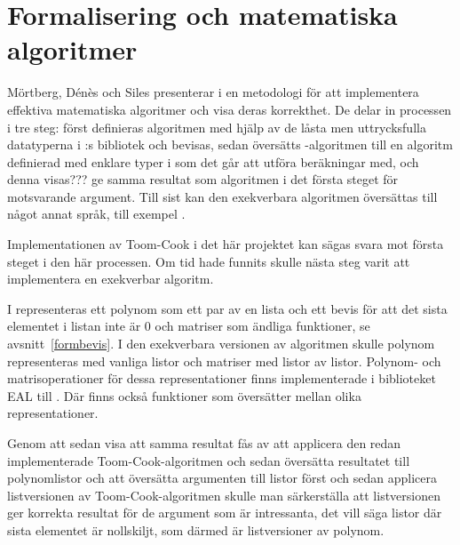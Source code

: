 \section{Formalisering och matematiska algoritmer}
\label{sec:exekverbert}
Mörtberg, Dénès och Siles presenterar i \cite{denes2012refinement} en
metodologi för att implementera effektiva matematiska algoritmer och visa deras
korrekthet. De delar in processen i tre steg: först definieras algoritmen med
hjälp av de låsta men uttrycksfulla datatyperna i \ssr{}:s bibliotek och
bevisas, sedan översätts \ssr{}-algoritmen till en algoritm definierad med
enklare typer i \ssr{} som det går att utföra beräkningar med, och denna
visas??? ge samma resultat som algoritmen i det första steget för motsvarande
argument. Till sist kan den exekverbara algoritmen översättas till något annat
språk, till exempel \haskell{}.

Implementationen av Toom-Cook i det här projektet kan sägas svara mot första
steget i den här processen. Om tid hade funnits skulle nästa steg varit att
implementera en exekverbar algoritm.

I \ssr{} representeras ett polynom som ett par av en lista och ett bevis för
att det sista elementet i listan inte är 0 och matriser som ändliga funktioner,
se avsnitt~\ref{formbevis}. I den exekverbara versionen av algoritmen skulle
polynom representeras med vanliga listor och matriser med listor av listor.
Polynom- och matrisoperationer för dessa representationer finns implementerade
i biblioteket \coq{}EAL\cite{coqeal} till \coq{}. Där finns också funktioner
som översätter mellan olika representationer.

Genom att sedan visa att samma resultat fås av att applicera den redan
implementerade Toom-Cook-algoritmen och sedan översätta resultatet till
polynomlistor och att översätta argumenten till listor först och sedan
applicera listversionen av Toom-Cook-algoritmen skulle man särkerställa att
listversionen ger korrekta resultat för de argument som är intressanta, det
vill säga listor där sista elementet är nollskiljt, som därmed är listversioner
av polynom.
